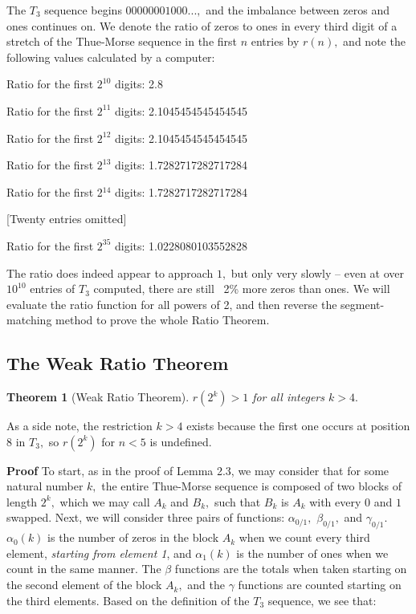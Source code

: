 \documentclass{article}
\newtheorem{theorem}{Theorem}[section]
\begin{document}
The $T_3$ sequence begins $00000001000...,$ and the imbalance between zeros and ones continues on. We denote the ratio of zeros to ones in every third digit of a stretch of the Thue-Morse sequence in the first $n$ entries by $r(n),$ and note the following values calculated by a computer:

Ratio for the first $2^{10}$ digits: 2.8

Ratio for the first $2^{11}$ digits: 2.1045454545454545

Ratio for the first $2^{12}$ digits: 2.1045454545454545

Ratio for the first $2^{13}$ digits: 1.7282717282717284

Ratio for the first 2$^{14}$ digits: 1.7282717282717284

[Twenty entries omitted]

Ratio for the first $2^{35}$ digits: 1.0228080103552828

The ratio does indeed appear to approach $1,$ but only very slowly -- even at over $10^{10}$ entries of $T_3$ computed, there are still ~2\% more zeros than ones. We will evaluate the ratio function for all powers of 2, and then reverse the segment-matching method to prove the whole Ratio Theorem.

\subsection{The Weak Ratio Theorem}

\begin{theorem}[Weak Ratio Theorem]
\label{wr}
$r(2^k) > 1$ for all integers $k > 4.$
\end{theorem}

As a side note, the restriction $k > 4$ exists because the first one occurs at position $8$ in $T_3,$ so $r(2^k)$ for $n < 5$ is undefined.

\textbf{Proof} To start, as in the proof of Lemma 2.3, we may consider that for some natural number $k,$ the entire Thue-Morse sequence is composed of two blocks of length $2^k,$ which we may call $A_k$ and $B_k,$ such that $B_k$ is $A_k$ with every $0$ and $1$ swapped. Next, we will consider three pairs of functions: $\alpha_{0/1},$ $\beta_{0/1},$ and $\gamma_{0/1}.$ $\alpha_0(k)$ is the number of zeros in the block $A_k$ when we count every third element, \emph{starting from element 1}, and $\alpha_1(k)$ is the number of ones when we count in the same manner. The $\beta$ functions are the totals when taken starting on the second element of the block $A_k,$ and the $\gamma$ functions are counted starting on the third elements. Based on the definition of the $T_3$ sequence, we see that:
\end{document}
